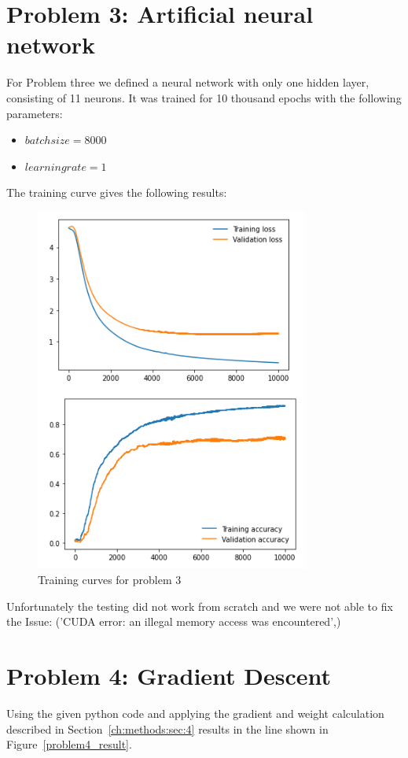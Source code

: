 \section{Problem 3: Artificial neural network}
For Problem three we defined a neural network with only one hidden layer, consisting of 11 neurons. It was trained for 10 thousand epochs with the following parameters:
\begin{itemize}
\item $batchsize = 8000$
\item $learning rate = 1$
\end{itemize}
The training curve gives the following results:
\begin{figure}[h]
	\centering
	\includegraphics[height=12cm]{img/problem3_curves.png}
	\caption{Training curves for problem 3}
    \label{problem4_imput_data}
\end{figure}
Unfortunately the testing did not work from scratch and we were not able to fix the Issue: ('CUDA error: an illegal memory access was encountered',)

\section{Problem 4: Gradient Descent}

Using the given python code and applying the gradient and weight calculation described in Section~\ref{ch:methods:sec:4} results in the line shown in Figure~\ref{problem4_result}.

